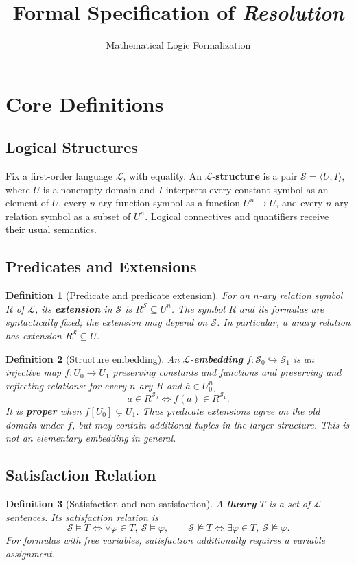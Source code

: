 \documentclass[11pt]{article}
\title{Formal Specification of \textit{Resolution}}
\author{Mathematical Logic Formalization}
\date{}
\newtheorem{definition}{Definition}
\newcommand{\Sat}{\models}
\newcommand{\NSat}{\not\models}
\newcommand{\Emb}{\hookrightarrow}
\begin{document}
\maketitle
\section{Core Definitions}
\subsection{Logical Structures}
Fix a first-order language $\mathcal L$, with equality. An $\mathcal L$-\textbf{structure} is a pair $\mathcal S=\langle U,I\rangle$, where $U$ is a nonempty domain and $I$ interprets every constant symbol as an element of $U$, every $n$-ary function symbol as a function $U^n\to U$, and every $n$-ary relation symbol as a subset of $U^n$. Logical connectives and quantifiers receive their usual semantics.
\subsection{Predicates and Extensions}
\begin{definition}[Predicate and predicate extension]
For an $n$-ary relation symbol $R$ of $\mathcal L$, its \textbf{extension} in $\mathcal S$ is $R^{\mathcal S}\subseteq U^n$. The symbol $R$ and its formulas are syntactically fixed; the extension may depend on $\mathcal S$. In particular, a unary relation has extension $R^{\mathcal S}\subseteq U$.
\end{definition}
\begin{definition}[Structure embedding]
An $\mathcal L$-\textbf{embedding} $f:\mathcal S_0\Emb\mathcal S_1$ is an injective map $f:U_0\to U_1$ preserving constants and functions and preserving \emph{and reflecting} relations: for every $n$-ary $R$ and $\bar a\in U_0^n$,
\[
\bar a\in R^{\mathcal S_0}\iff f(\bar a)\in R^{\mathcal S_1}.
\]
It is \textbf{proper} when $f[U_0]\subsetneq U_1$. Thus predicate extensions agree on the old domain under $f$, but may contain additional tuples in the larger structure. This is not an elementary embedding in general.
\end{definition}
\subsection{Satisfaction Relation}
\begin{definition}[Satisfaction and non-satisfaction]
A \textbf{theory} $T$ is a set of $\mathcal L$-sentences. Its satisfaction relation is
\[
\mathcal S\Sat T\iff \forall\varphi\in T,\ \mathcal S\Sat\varphi,
\qquad
\mathcal S\NSat T\iff \exists\varphi\in T,\ \mathcal S\NSat\varphi.
\]
For formulas with free variables, satisfaction additionally requires a variable assignment.
\end{definition}
\end{document}
